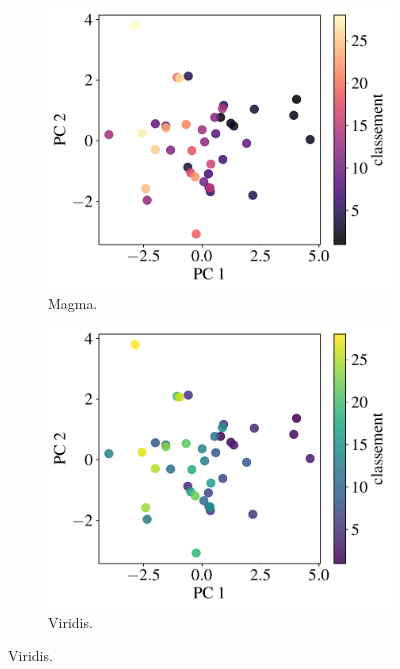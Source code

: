\begin{figure}[h]
  \centering
  \begin{subfigure}[t]{0.30\textwidth}
    \includegraphics[width=\textwidth]{figures/pratiques/pca_plot_magma}  
    \caption{Magma.}
    \label{fig:pca_plot_magma}
  \end{subfigure}  \hfill
  \begin{subfigure}[t]{0.30\textwidth}
    \includegraphics[width=\textwidth]{figures/pratiques/pca_plot_viridis}  
    \caption{Viridis.}
    \label{fig:pca_plot_viridis}
  \end{subfigure} \hfill

\end{figure}
